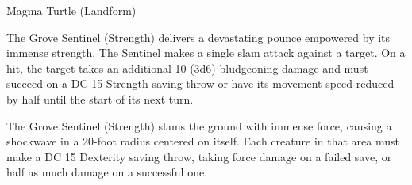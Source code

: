 \documentclass[letterpaper,openany,twoside,twocolumn]{book}
\begin{document}
\begin{DndMonster}[width=0.5\textwidth +0.5em]{Magma Turtle (Landform)}
	\DndMonsterAttack[
      name=Slam,
      distance=melee, %
      mod=+9,
      reach=10,
      targets=one target,
      dmg=\DndDice{2d6 + 5},
      dmg-type=bludgeoning,
    ]
    
    The Grove Sentinel (Strength) delivers a devastating pounce empowered by its immense strength. The Sentinel makes a single slam attack against a target. On a hit, the target takes an additional 10 (3d6) bludgeoning damage and must succeed on a DC 15 Strength saving throw or have its movement speed reduced by half until the start of its next turn.
    
	The Grove Sentinel (Strength) slams the ground with immense force, causing a shockwave in a 20-foot radius centered on itself. Each creature in that area must make a DC 15 Dexterity saving throw, taking  force damage on a failed save, or half as much damage on a successful one.
      
\end{DndMonster}

%
\end{document}
